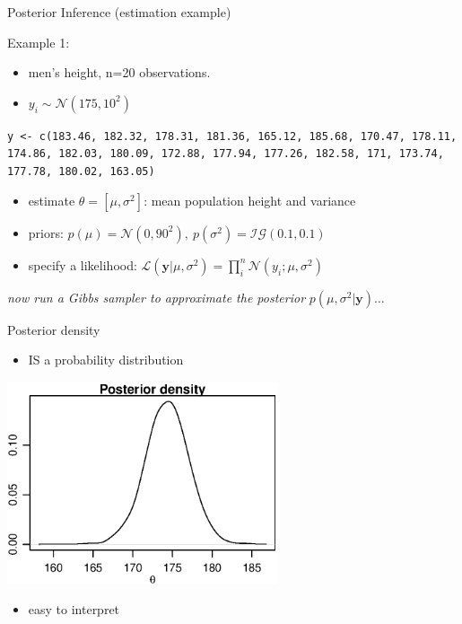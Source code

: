 \documentclass[presentation,9pt,xcolor=dvipsnames]{beamer}
\begin{document}
\begin{frame}[fragile,label={sec:org4f3c69e}]{Posterior Inference (estimation example)}
 \begin{block}{Example 1:}
\begin{itemize}
\item men's height, n=20 observations.
\item \(y_i\sim\mathcal{N}(175,10^2)\)
\end{itemize}
\texttt{y <- c(183.46, 182.32, 178.31, 181.36, 165.12, 185.68, 170.47, 178.11, 174.86, 182.03, 180.09, 172.88, 177.94, 177.26, 182.58, 171, 173.74, 177.78, 180.02, 163.05)}
\begin{itemize}
\item estimate \(\theta=[\mu,\sigma^2]\): mean population height and variance
\item priors:  \(p(\mu)=\mathcal{N}(0,90^2),\ p(\sigma^2)=\mathcal{IG}(0.1,0.1)\)
\item specify a likelihood: \(\mathcal{L}(\mathbf{y}\vert\mu,\sigma^2)=\prod_i^n\mathcal{N}(y_i; \mu,\sigma^2)\)
\end{itemize}
\end{block}
\begin{block}{\emph{now run a Gibbs sampler to approximate the posterior} \(p(\mu,\sigma^2\vert \mathbf{y})\dots\)}
\end{block}
\end{frame}
\begin{frame}[label={sec:org45839ab}]{Posterior density}
\begin{itemize}
\item IS a probability distribution
\end{itemize}
\begin{center}
\includegraphics[width=0.6\textwidth,height=0.6\textheight]{posterior1.eps}
\end{center}
\begin{itemize}
\item easy to interpret
\end{itemize}
\end{frame}
\end{document}

